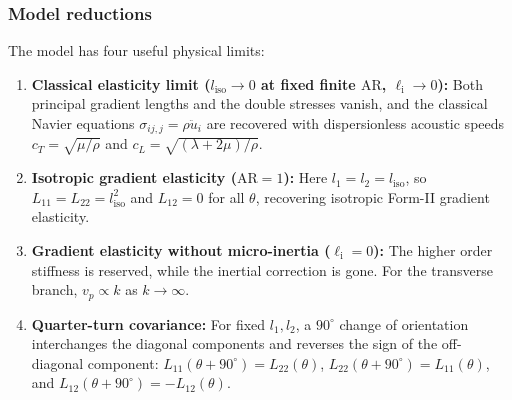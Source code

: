 \subsubsection{Model reductions}
The model has four useful physical limits:
\begin{enumerate}[label=(\roman*)]
  \item \textbf{Classical elasticity limit ($l_{\mathrm{iso}} \to 0$ at fixed finite $\mathrm{AR}$, $\ell_{\mathrm{i}} \to 0$):} Both principal gradient lengths and the double stresses vanish, and the classical Navier equations $\sigma_{ij,j}=\rho\ddot u_i$ are recovered with dispersionless acoustic speeds $c_T=\sqrt{\mu/\rho}$ and $c_L=\sqrt{(\lambda+2\mu)/\rho}$.
  \item \textbf{Isotropic gradient elasticity ($\mathrm{AR} = 1$):} Here $l_1 = l_2 = l_{\mathrm{iso}}$, so $L_{11} = L_{22} = l_{\mathrm{iso}}^2$ and $L_{12} = 0$ for all $\theta$, recovering isotropic Form-II gradient elasticity.
  \item \textbf{Gradient elasticity without micro-inertia ($\ell_{\mathrm{i}} = 0$):} The higher order stiffness is reserved, while the inertial correction is gone. For the transverse branch, $v_p\propto k$ as $k\to\infty$.
  \item \textbf{Quarter-turn covariance:} For fixed $l_1,l_2$, a $90^\circ$ change of orientation interchanges the diagonal components and reverses the sign of the off-diagonal component: $L_{11}(\theta+90^\circ)=L_{22}(\theta)$, $L_{22}(\theta+90^\circ)=L_{11}(\theta)$, and $L_{12}(\theta+90^\circ)=-L_{12}(\theta)$.
\end{enumerate}

